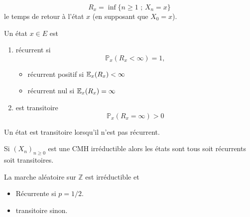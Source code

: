 $$
R_x=\inf\{n\geq 1\text{ ; }X_n=x\}
$$ 
le temps de retour à l'état $x$ (en supposant que $X_0=x$).
\begin{definition}
Un état $x\in E$ est
\begin{enumerate}
\item récurrent si
$$
\mathbb{P}_x(R_x<\infty)=1,
$$ 
\begin{itemize}
    \item récurrent positif si $\mathbb{E}_x(R_x) <\infty$
    \item récurrent nul si $\mathbb{E}_x(R_x) =\infty$
\end{itemize}
\item est transitoire
$$
\mathbb{P}_x(R_x=\infty)>0
$$
\end{enumerate}
Un état est transitoire lorsqu'il n'est pas récurrent.
\end{definition}
Si $(X_n)_{n\geq 0}$ est une CMH irréductible alors les états sont tous soit récurrents soit transitoires.
\begin{theo}
La marche aléatoire sur $\mathbb{Z}$ est irréductible et
\begin{itemize}
\item Récurrente si $p=1/2$.
\item transitoire sinon.
\end{itemize}
\end{theo}
